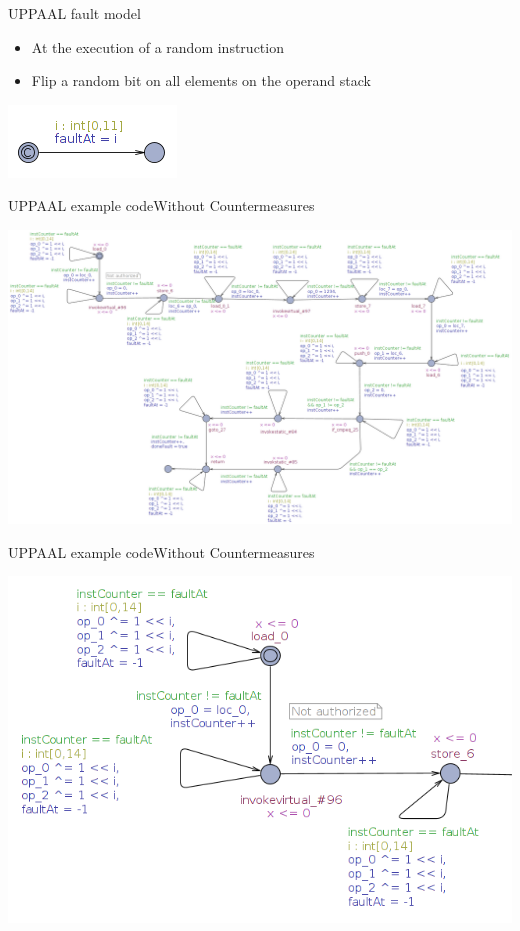 \begin{frame}{UPPAAL fault model}
\begin{itemize}
\item At the execution of a random instruction
\item Flip a random bit on all elements on the operand stack
\end{itemize}
\begin{center}
\includegraphics[scale=0.5]{figures/faultmodel.png}
\end{center}
\end{frame}

\begin{frame}{UPPAAL example code}{Without Countermeasures}
\begin{adjustwidth}{-2cm}{-2cm}
\begin{center}
\includegraphics[scale=0.22]{figures/tinyJCL.png}
\end{center}
\end{adjustwidth}
\end{frame}

\begin{frame}{UPPAAL example code}{Without Countermeasures}
\begin{center}
\includegraphics[scale=0.4]{figures/tinyJCLexplained.png}
\end{center}
\end{frame}

